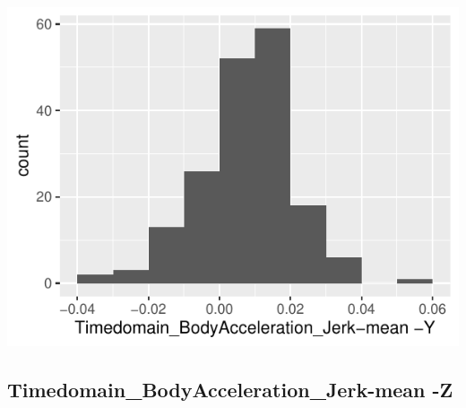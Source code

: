 \documentclass[
]{article}
\begin{document}
\begin{minipage}{0.25 \textwidth}

\includegraphics{codebook_tidydatasub_files/figure-latex/Var-16-Timedomain-BodyAcceleration-Jerk-mean--Y-1.pdf}

\end{minipage}

\noindent\makebox[\linewidth]{\rule{\textwidth}{0.4pt}}

\hypertarget{timedomain_bodyacceleration_jerk-mean--z}{%
\subsection{Timedomain\_BodyAcceleration\_Jerk-mean
-Z}\label{timedomain_bodyacceleration_jerk-mean--z}}
\end{document}

